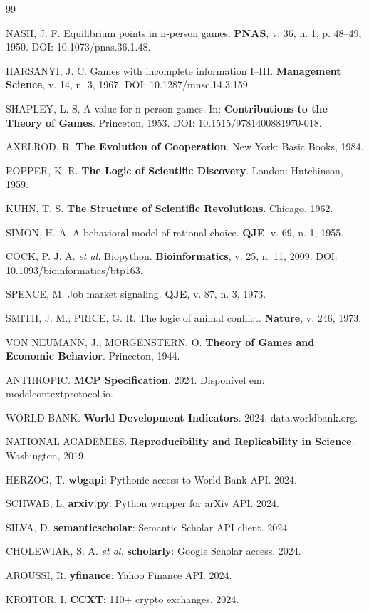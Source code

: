 \documentclass[12pt,a4paper]{article}
\begin{document}
\begin{thebibliography}{99}

NASH, J. F. Equilibrium points in n-person games. \textbf{PNAS}, v. 36, n. 1, p. 48--49, 1950.
DOI: 10.1073/pnas.36.1.48.

HARSANYI, J. C. Games with incomplete information I--III. \textbf{Management Science}, v. 14, n. 3, 1967.
DOI: 10.1287/mnsc.14.3.159.

SHAPLEY, L. S. A value for n-person games. In: \textbf{Contributions to the Theory of Games}. Princeton, 1953.
DOI: 10.1515/9781400881970-018.

AXELROD, R. \textbf{The Evolution of Cooperation}. New York: Basic Books, 1984.

POPPER, K. R. \textbf{The Logic of Scientific Discovery}. London: Hutchinson, 1959.

KUHN, T. S. \textbf{The Structure of Scientific Revolutions}. Chicago, 1962.

SIMON, H. A. A behavioral model of rational choice. \textbf{QJE}, v. 69, n. 1, 1955.

COCK, P. J. A. \textit{et al.} Biopython. \textbf{Bioinformatics}, v. 25, n. 11, 2009.
DOI: 10.1093/bioinformatics/btp163.

SPENCE, M. Job market signaling. \textbf{QJE}, v. 87, n. 3, 1973.

SMITH, J. M.; PRICE, G. R. The logic of animal conflict. \textbf{Nature}, v. 246, 1973.

VON NEUMANN, J.; MORGENSTERN, O. \textbf{Theory of Games and Economic Behavior}. Princeton, 1944.

ANTHROPIC. \textbf{MCP Specification}. 2024. Disponível em: modelcontextprotocol.io.

WORLD BANK. \textbf{World Development Indicators}. 2024. data.worldbank.org.

NATIONAL ACADEMIES. \textbf{Reproducibility and Replicability in Science}. Washington, 2019.

HERZOG, T. \textbf{wbgapi}: Pythonic access to World Bank API. 2024.

SCHWAB, L. \textbf{arxiv.py}: Python wrapper for arXiv API. 2024.

SILVA, D. \textbf{semanticscholar}: Semantic Scholar API client. 2024.

CHOLEWIAK, S. A. \textit{et al.} \textbf{scholarly}: Google Scholar access. 2024.

AROUSSI, R. \textbf{yfinance}: Yahoo Finance API. 2024.

KROITOR, I. \textbf{CCXT}: 110+ crypto exchanges. 2024.

\end{thebibliography}
\end{document}
